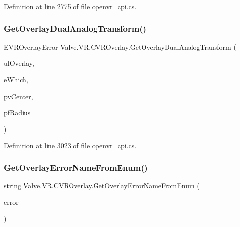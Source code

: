 Definition at line 2775 of file openvr\+\_\+api.\+cs.

\mbox{\label{class_valve_1_1_v_r_1_1_c_v_r_overlay_ad92db61b0745972e2da6fa0ba2595a33}} 
\subsubsection{\texorpdfstring{GetOverlayDualAnalogTransform()}{GetOverlayDualAnalogTransform()}}
{\footnotesize\ttfamily \mbox{\hyperlink{namespace_valve_1_1_v_r_aaee5c5144f42b7969d45b854f51b0c18}{E\+V\+R\+Overlay\+Error}} Valve.\+V\+R.\+C\+V\+R\+Overlay.\+Get\+Overlay\+Dual\+Analog\+Transform (\begin{DoxyParamCaption}\item[{ulong}]{ul\+Overlay,  }\item[{\mbox{\hyperlink{namespace_valve_1_1_v_r_a3a5fe210bea8b993a1ad42f680119e90}{E\+Dual\+Analog\+Which}}}]{e\+Which,  }\item[{ref \mbox{\hyperlink{struct_valve_1_1_v_r_1_1_hmd_vector2__t}{Hmd\+Vector2\+\_\+t}}}]{pv\+Center,  }\item[{ref float}]{pf\+Radius }\end{DoxyParamCaption})}



Definition at line 3023 of file openvr\+\_\+api.\+cs.

\mbox{\label{class_valve_1_1_v_r_1_1_c_v_r_overlay_aa229e018f282d14374250dd370bcc93e}} 
\subsubsection{\texorpdfstring{GetOverlayErrorNameFromEnum()}{GetOverlayErrorNameFromEnum()}}
{\footnotesize\ttfamily string Valve.\+V\+R.\+C\+V\+R\+Overlay.\+Get\+Overlay\+Error\+Name\+From\+Enum (\begin{DoxyParamCaption}\item[{\mbox{\hyperlink{namespace_valve_1_1_v_r_aaee5c5144f42b7969d45b854f51b0c18}{E\+V\+R\+Overlay\+Error}}}]{error }\end{DoxyParamCaption})}



